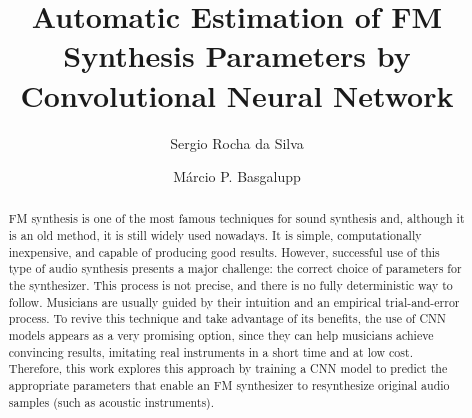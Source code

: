 \documentclass[sigconf,natbib=false]{acmart}
\begin{document}
\title{Automatic Estimation of FM Synthesis Parameters by Convolutional Neural Network}
\renewcommand{\shorttitle}{Hope it is}

\author{Sergio Rocha da Silva}

\author{Márcio P. Basgalupp}

\renewcommand{\shortauthors}{B. Trovato et al.}

\begin{abstract}
  FM synthesis is one of the most famous techniques for sound synthesis and, although it is an old method, it is still widely used nowadays. It is simple, computationally inexpensive, and capable of producing good results. However, successful use of this type of audio synthesis presents a major challenge: the correct choice of parameters for the synthesizer. This process is not precise, and there is no fully deterministic way to follow. Musicians are usually guided by their intuition and an empirical trial-and-error process. To revive this technique and take advantage of its benefits, the use of CNN models appears as a very promising option, since they can help musicians achieve convincing results, imitating real instruments in a short time and at low cost. Therefore, this work explores this approach by training a CNN model to predict the appropriate parameters that enable an FM synthesizer to resynthesize original audio samples (such as acoustic instruments).
\end{abstract}
\end{document}
